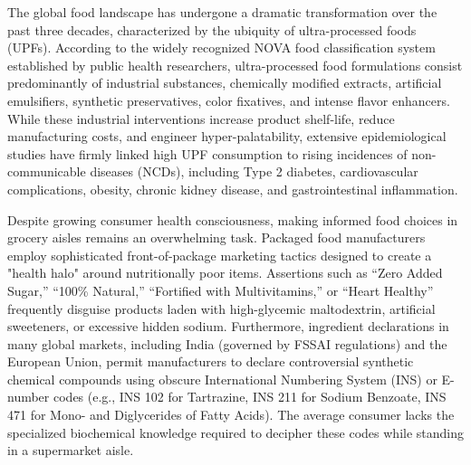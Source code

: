 \documentclass[12pt]{article}
\begin{document}
\noindent
The global food landscape has undergone a dramatic transformation over the past three decades, characterized by the ubiquity of ultra-processed foods (UPFs). According to the widely recognized NOVA food classification system established by public health researchers, ultra-processed food formulations consist predominantly of industrial substances, chemically modified extracts, artificial emulsifiers, synthetic preservatives, color fixatives, and intense flavor enhancers. While these industrial interventions increase product shelf-life, reduce manufacturing costs, and engineer hyper-palatability, extensive epidemiological studies have firmly linked high UPF consumption to rising incidences of non-communicable diseases (NCDs), including Type 2 diabetes, cardiovascular complications, obesity, chronic kidney disease, and gastrointestinal inflammation.

\vspace{0.3cm}

\noindent
Despite growing consumer health consciousness, making informed food choices in grocery aisles remains an overwhelming task. Packaged food manufacturers employ sophisticated front-of-package marketing tactics designed to create a "health halo" around nutritionally poor items. Assertions such as ``Zero Added Sugar,'' ``100\% Natural,'' ``Fortified with Multivitamins,'' or ``Heart Healthy'' frequently disguise products laden with high-glycemic maltodextrin, artificial sweeteners, or excessive hidden sodium. Furthermore, ingredient declarations in many global markets, including India (governed by FSSAI regulations) and the European Union, permit manufacturers to declare controversial synthetic chemical compounds using obscure International Numbering System (INS) or E-number codes (e.g., INS 102 for Tartrazine, INS 211 for Sodium Benzoate, INS 471 for Mono- and Diglycerides of Fatty Acids). The average consumer lacks the specialized biochemical knowledge required to decipher these codes while standing in a supermarket aisle.

\vspace{0.3cm}
\end{document}
